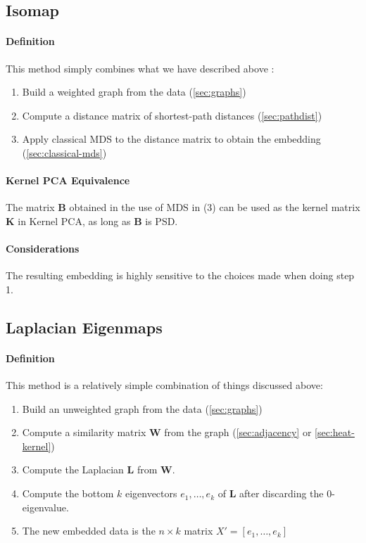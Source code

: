 \documentclass[12pt,a4paper]{article}
\newcommand{\1}[1]{\mathds{1}\left[#1\right]}
\newcommand{\B}[1]{\mathbf{#1}}
\begin{document}
\subsection{Isomap}
\paragraph{Definition}
This method simply combines what we have described above \cite{isomap}:
\begin{enumerate}
    \item Build a weighted graph from the data (\ref{sec:graphs})
    \item Compute a distance matrix of shortest-path distances (\ref{sec:pathdist})
    \item Apply classical MDS to the distance matrix to obtain the embedding (\ref{sec:classical-mds})
\end{enumerate}
\paragraph{Kernel PCA Equivalence} The matrix $\B B$ obtained in the use of MDS in (3) can be used as the kernel matrix $\B K$ in Kernel PCA, as long as $\B B$ is PSD. \cite{fml}
\paragraph{Considerations} The resulting embedding is highly sensitive to the choices made when doing step 1.
\subsection{Laplacian Eigenmaps}\label{sec:laplacian-eigenmaps}
\paragraph{Definition} This method is a relatively simple combination of things discussed above:
\begin{enumerate}
    \item Build an unweighted graph from the data (\ref{sec:graphs})
    \item Compute a similarity matrix $\B W$ from the graph (\ref{sec:adjacency} or \ref{sec:heat-kernel})
    \item Compute the Laplacian $\B L$ from $\B W$. 
    \item Compute the bottom $k$ eigenvectors $e_1,\ldots,e_k$ of $\B L$ after discarding the 0-eigenvalue.
    \item The new embedded data is the $n\times k$ matrix $X'=[e_1,\ldots,e_k]$
\end{enumerate}
\end{document}
